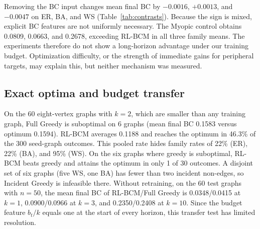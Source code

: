 \documentclass[runningheads]{llncs}
\newcommand{\rlbcm}{RL-BCM}
\begin{document}
Removing the BC input changes mean final BC by $-0.0016$, $+0.0013$, and
$-0.0047$ on ER, BA, and WS (Table~\ref{tab:contrasts}). Because the sign
is mixed, explicit BC features are not uniformly necessary. The
Myopic control obtains 0.0809, 0.0663, and 0.2678, exceeding \rlbcm{} in
all three family means. The experiments therefore do not show a
long-horizon advantage under our training budget. Optimization difficulty,
or the strength of immediate gains for peripheral targets, may explain
this, but neither mechanism was measured.

\subsection{Exact optima and budget transfer}
\label{sec:diagnostics}
On the 60 eight-vertex graphs with $k=2$, which are smaller than any
training graph, Full Greedy is suboptimal on 6 graphs (mean final BC 0.1583 versus optimum 0.1594). \rlbcm{} averages
0.1188 and reaches the optimum in 46.3\% of the 300 seed-graph outcomes.
This pooled rate hides family rates of 22\% (ER), 22\% (BA), and 95\% (WS).
On the six graphs where greedy is suboptimal, \rlbcm{} beats greedy and
attains the optimum in only 1 of 30 outcomes. A disjoint set of six graphs
(five WS, one BA) has fewer than two incident non-edges, so Incident Greedy
is infeasible there. Without retraining, on the 60 test graphs with $n=50$, the mean final BC of
\rlbcm{}/Full Greedy is 0.0348/0.0415 at $k=1$, 0.0900/0.0966 at $k=3$, and
0.2350/0.2408 at $k=10$. Since the budget feature $b_t/k$ equals one at the
start of every horizon, this transfer test has limited resolution.
\end{document}
